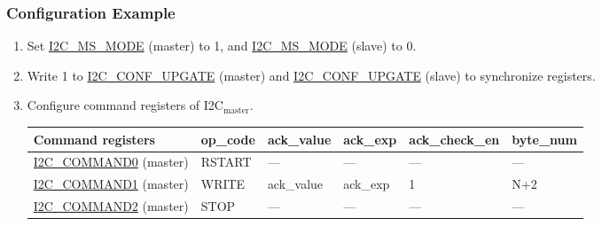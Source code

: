 \documentclass[main\_\_EN.tex]{subfiles}
\begin{document}
\subsubsection{Configuration Example}
\begin{enumerate}
\item Set \hyperref[fielddesc:I2CMSMODE]{I2C\_MS\_MODE} (master) to 1, and \hyperref[fielddesc:I2CMSMODE]{I2C\_MS\_MODE} (slave) to 0.
\item Write 1 to \hyperref[fielddesc:I2CCONFUPGATE]{I2C\_CONF\_UPGATE} (master) and \hyperref[fielddesc:I2CCONFUPGATE]{I2C\_CONF\_UPGATE} (slave) to synchronize registers.
\item Configure command registers of I2C$_\text{master}$.

\begin{longtable}{ | p{4cm} | p{2cm} | p{2cm} | p{2cm} |p{2cm} | p{2cm} |}
\hline\rowcolor{lightgray}
Command registers& op\_code & ack\_value&ack\_exp&ack\_check\_en&byte\_num  \\ \hline
\hyperref[fielddesc:I2CCOMMAND0]{I2C\_COMMAND0} (master)& RSTART& ---&---&---&---  \\ \hline
\hyperref[fielddesc:I2CCOMMAND1]{I2C\_COMMAND1} (master)& WRITE& ack\_value&ack\_exp&1&N+2  \\ \hline
\hyperref[fielddesc:I2CCOMMAND2]{I2C\_COMMAND2} (master)& STOP& ---&---&---&---  \\ \hline
\end{longtable}


\end{enumerate}
\end{document}
